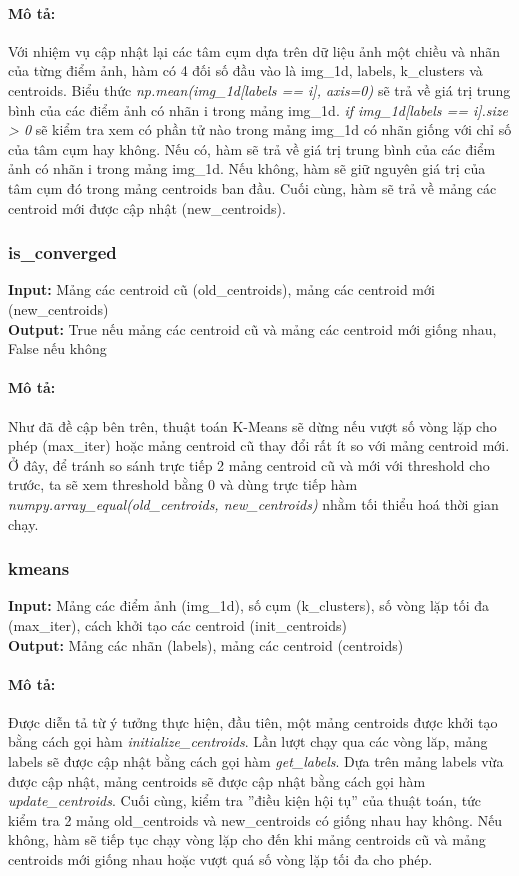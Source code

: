 \documentclass{article}
\begin{document}
\paragraph{Mô tả:}
Với nhiệm vụ cập nhật lại các tâm cụm dựa trên dữ liệu ảnh một chiều và nhãn của từng điểm ảnh, hàm có 4 đối số đầu vào là img\_1d, labels, k\_clusters và centroids. Biểu thức \textit{np.mean(img\_1d[labels == i], axis=0)} sẽ trả về giá trị trung bình của các điểm ảnh có nhãn i trong mảng img\_1d. \textit{if img\_1d[labels == i].size > 0} sẽ kiểm tra xem có phần tử nào trong mảng img\_1d có nhãn giống với chỉ số của tâm cụm hay không. Nếu có, hàm sẽ trả về giá trị trung bình của các điểm ảnh có nhãn i trong mảng img\_1d. Nếu không, hàm sẽ giữ nguyên giá trị của tâm cụm đó trong mảng centroids ban đầu. Cuối cùng, hàm sẽ trả về mảng các centroid mới được cập nhật (new\_centroids). 

\subsubsection{is\_converged}
\textbf{Input:} Mảng các centroid cũ (old\_centroids), mảng các centroid mới (new\_centroids) \\
\textbf{Output:} True nếu mảng các centroid cũ và mảng các centroid mới giống nhau, False nếu không

\paragraph{Mô tả:}
Như đã đề cập bên trên, thuật toán K-Means sẽ dừng nếu vượt số vòng lặp cho phép (max\_iter) hoặc mảng centroid cũ thay đổi rất ít so với mảng centroid mới. Ở đây, để tránh so sánh trực tiếp 2 mảng centroid cũ và mới với threshold cho trước, ta sẽ xem threshold bằng 0 và dùng trực tiếp hàm \textit{numpy.array\_equal(old\_centroids, new\_centroids)} nhằm tối thiểu hoá thời gian chạy.

\subsubsection{kmeans}
\textbf{Input:} Mảng các điểm ảnh (img\_1d), số cụm (k\_clusters), số vòng lặp tối đa (max\_iter), cách khởi tạo các centroid (init\_centroids) \\
\textbf{Output:} Mảng các nhãn (labels), mảng các centroid (centroids)

\paragraph{Mô tả:}
Được diễn tả từ ý tưởng thực hiện, đầu tiên, một mảng centroids được khởi tạo bằng cách gọi hàm \textit{initialize\_centroids}. Lần lượt chạy qua các vòng lăp, mảng labels sẽ được cập nhật bằng cách gọi hàm \textit{get\_labels}. Dựa trên mảng labels vừa được cập nhật, mảng centroids sẽ được cập nhật bằng cách gọi hàm \textit{update\_centroids}. Cuối cùng, kiểm tra ''điều kiện hội tụ'' của thuật toán, tức kiểm tra 2 mảng old\_centroids và new\_centroids có giống nhau hay không. Nếu không, hàm sẽ tiếp tục chạy vòng lặp cho đến khi mảng centroids cũ và mảng centroids mới giống nhau hoặc vượt quá số vòng lặp tối đa cho phép.
\end{document}
